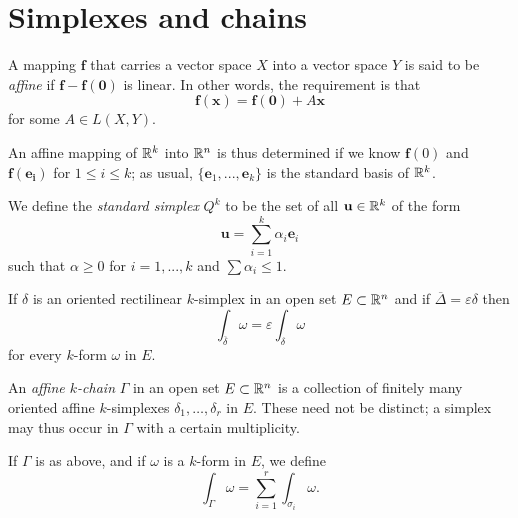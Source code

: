 
\section{Simplexes and chains}

\begin{mydef}
    \label{mydef:10.26}
    A mapping $\mathbf{f}$ that carries a vector space $X$ into a
    vector space $Y$ is said to be \emph{affine} if $\mathbf{f - f(0)}$ is linear. 
    In other words, the requirement is that
    \begin{equation}
        \label{eq:10.73}
        \mathbf{f(x)} = 
        \mathbf{f(0)} + A \mathbf{x}
    \end{equation}
    for some $A \in L(X, Y)$.

    An affine mapping of ${\protect\mathbb R}^k$ into ${\protect\mathbb R}^n$ is thus determined if we know $\mathbf{f}(0)$ and $\mathbf{f(e_i)}$ for $1 \leq i \leq k$; 
    as usual, $\{\mathbf{e}_1, ... , \mathbf{e}_k\}$ is the standard basis of ${\protect\mathbb R}^k$.
    
    We define the \emph{standard simplex} $Q^k$ to be the set of all $\mathbf{u} \in {\protect\mathbb R}^k$ of the form
    \begin{equation}
        \label{eq;10.74}
        \mathbf{u} = \sum_{i=1}^{k} \alpha_i \mathbf{e}_i
    \end{equation}
    such that $\alpha \geq 0$ for $i = 1, ... , k$ and $\sum \alpha_i \leq 1$.
\end{mydef}

\begin{thm}
    \label{thm:10.27}
    If $\delta$ is an oriented rectilinear $k$-simplex in an open set $E \subset {\protect\mathbb R}^n$ 
    and if $\overline{\Delta} = \varepsilon \delta$ then
    \begin{equation}
        \label{eq:10.81}
        \int_{\overline{\delta}} \omega = 
        \varepsilon \int_{\delta} \omega 
    \end{equation}
    for every $k$-form $\omega$ in $E$.
\end{thm}


\begin{mydef}
    \label{mydef:10.28}
    An \emph{affine $k$-chain} $\Gamma$ in an open set $E \subset {\protect\mathbb R}^n$ is a collection of finitely many oriented affine $k$-simplexes $\delta_1, \dots, \delta_r$ in $E$. 
    These need not be distinct; 
    a simplex may thus occur in $\Gamma$ with a certain multiplicity.

    If $\Gamma$ is as above, and if $\omega$ is a $k$-form in $E$,
    we define 
    \begin{equation}
        \label{eq:10.82}
        \int_{\Gamma} \omega =
        \sum_{i=1}^{r} \int_{\sigma_i} \omega .
    \end{equation}
\end{mydef}

